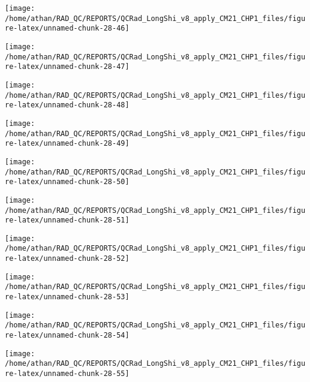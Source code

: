 \documentclass[
  10pt,
  a4paper,oneside]{article}
\begin{document}
\begin{center}\texttt{[image: /home/athan/RAD\_QC/REPORTS/QCRad\_LongShi\_v8\_apply\_CM21\_CHP1\_files/figure-latex/unnamed-chunk-28-46]} \end{center}

\begin{center}\texttt{[image: /home/athan/RAD\_QC/REPORTS/QCRad\_LongShi\_v8\_apply\_CM21\_CHP1\_files/figure-latex/unnamed-chunk-28-47]} \end{center}

\begin{center}\texttt{[image: /home/athan/RAD\_QC/REPORTS/QCRad\_LongShi\_v8\_apply\_CM21\_CHP1\_files/figure-latex/unnamed-chunk-28-48]} \end{center}

\begin{center}\texttt{[image: /home/athan/RAD\_QC/REPORTS/QCRad\_LongShi\_v8\_apply\_CM21\_CHP1\_files/figure-latex/unnamed-chunk-28-49]} \end{center}

\begin{center}\texttt{[image: /home/athan/RAD\_QC/REPORTS/QCRad\_LongShi\_v8\_apply\_CM21\_CHP1\_files/figure-latex/unnamed-chunk-28-50]} \end{center}

\begin{center}\texttt{[image: /home/athan/RAD\_QC/REPORTS/QCRad\_LongShi\_v8\_apply\_CM21\_CHP1\_files/figure-latex/unnamed-chunk-28-51]} \end{center}

\begin{center}\texttt{[image: /home/athan/RAD\_QC/REPORTS/QCRad\_LongShi\_v8\_apply\_CM21\_CHP1\_files/figure-latex/unnamed-chunk-28-52]} \end{center}

\begin{center}\texttt{[image: /home/athan/RAD\_QC/REPORTS/QCRad\_LongShi\_v8\_apply\_CM21\_CHP1\_files/figure-latex/unnamed-chunk-28-53]} \end{center}

\begin{center}\texttt{[image: /home/athan/RAD\_QC/REPORTS/QCRad\_LongShi\_v8\_apply\_CM21\_CHP1\_files/figure-latex/unnamed-chunk-28-54]} \end{center}

\begin{center}\texttt{[image: /home/athan/RAD\_QC/REPORTS/QCRad\_LongShi\_v8\_apply\_CM21\_CHP1\_files/figure-latex/unnamed-chunk-28-55]} \end{center}
\end{document}
